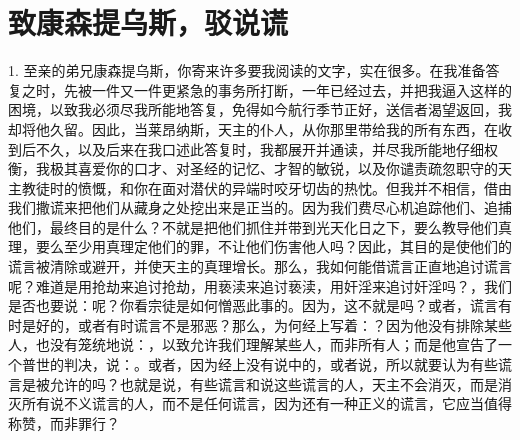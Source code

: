 
\chapter{致康森提乌斯，驳说谎}


\par

1. 至亲的弟兄康森提乌斯，你寄来许多要我阅读的文字，实在很多。在我准备答复之时，先被一件又一件更紧急的事务所打断，一年已经过去，并把我逼入这样的困境，以致我必须尽我所能地答复，免得如今航行季节正好，送信者渴望返回，我却将他久留。因此，当莱昂纳斯，天主的仆人，从你那里带给我的所有东西，在收到后不久，以及后来在我口述此答复时，我都展开并通读，并尽我所能地仔细权衡，我极其喜爱你的口才、对圣经的记忆、才智的敏锐，以及你谴责疏忽职守的天主教徒时的愤慨，和你在面对潜伏的异端时咬牙切齿的热忱。但我并不相信，借由我们撒谎来把他们从藏身之处挖出来是正当的。因为我们费尽心机追踪他们、追捕他们，最终目的是什么？不就是把他们抓住并带到光天化日之下，要么教导他们真理，要么至少用真理定他们的罪，不让他们伤害他人吗？因此，其目的是使他们的谎言被清除或避开，并使天主的真理增长。那么，我如何能借谎言正直地追讨谎言呢？难道是用抢劫来追讨抢劫，用亵渎来追讨亵渎，用奸淫来追讨奸淫吗？，我们是否也要说：呢？你看宗徒是如何憎恶此事的。因为，这不就是吗？或者，谎言有时是好的，或者有时谎言不是邪恶？那么，为何经上写着：？因为他没有排除某些人，也没有笼统地说：，以致允许我们理解某些人，而非所有人；而是他宣告了一个普世的判决，说：。或者，因为经上没有说中的，或者说，所以就要认为有些谎言是被允许的吗？也就是说，有些谎言和说这些谎言的人，天主不会消灭，而是消灭所有说不义谎言的人，而不是任何谎言，因为还有一种正义的谎言，它应当值得称赞，而非罪行？\par

